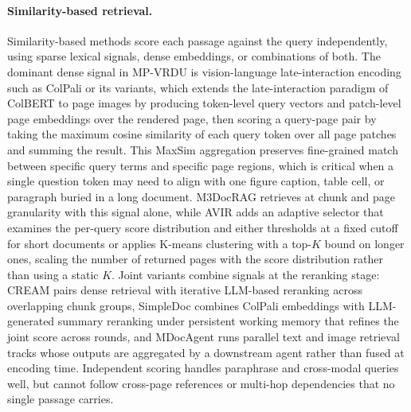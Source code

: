 \documentclass[11pt]{article}
\begin{document}
\paragraph{Similarity-based retrieval.} Similarity-based methods score each passage against the query independently, using sparse lexical signals, dense embeddings, or combinations of both. The dominant dense signal in MP-VRDU is vision-language late-interaction encoding such as ColPali \cite{faysse2024colpali} or its variants, which extends the late-interaction paradigm of ColBERT \cite{khattab2020colbert} to page images by producing token-level query vectors and patch-level page embeddings over the rendered page, then scoring a query-page pair by taking the maximum cosine similarity of each query token over all page patches and summing the result. This MaxSim aggregation preserves fine-grained match between specific query terms and specific page regions, which is critical when a single question token may need to align with one figure caption, table cell, or paragraph buried in a long document. M3DocRAG \cite{cho2024m3docrag} retrieves at chunk and page granularity with this signal alone, while AVIR \cite{li2025avir} adds an adaptive selector that examines the per-query score distribution and either thresholds at a fixed cutoff for short documents or applies K-means clustering with a top-$K$ bound on longer ones, scaling the number of returned pages with the score distribution rather than using a static $K$. Joint variants combine signals at the reranking stage: CREAM \cite{zhang2024cream} pairs dense retrieval with iterative LLM-based reranking across overlapping chunk groups, SimpleDoc \cite{jain2025simpledoc} combines ColPali embeddings with LLM-generated summary reranking under persistent working memory that refines the joint score across rounds, and MDocAgent \cite{han2025mdocagent} runs parallel text and image retrieval tracks whose outputs are aggregated by a downstream agent rather than fused at encoding time. Independent scoring handles paraphrase and cross-modal queries well, but cannot follow cross-page references or multi-hop dependencies that no single passage carries.
\end{document}

